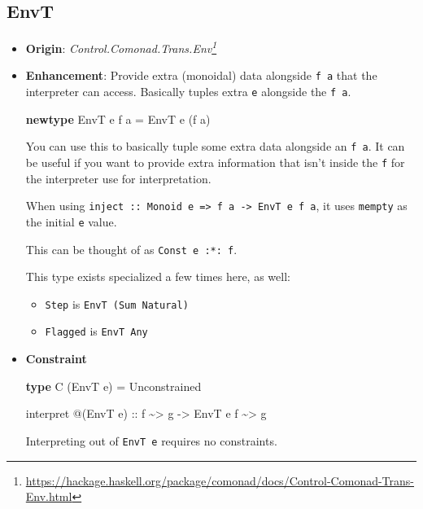 \documentclass[]{article}
\newenvironment{Shaded}{}{}
\newcommand{\DataTypeTok}[1]{\textcolor[rgb]{0.56,0.13,0.00}{#1}}
\newcommand{\KeywordTok}[1]{\textcolor[rgb]{0.00,0.44,0.13}{\textbf{#1}}}
\newcommand{\NormalTok}[1]{#1}
\newcommand{\OperatorTok}[1]{\textcolor[rgb]{0.40,0.40,0.40}{#1}}
\newcommand{\OtherTok}[1]{\textcolor[rgb]{0.00,0.44,0.13}{#1}}
\renewcommand{\href}[2]{#2\footnote{\url{#1}}}
\begin{document}
\hypertarget{envt}{%
\subsection{EnvT}\label{envt}}

\begin{itemize}
\item
  \textbf{Origin}:
  \emph{\href{https://hackage.haskell.org/package/comonad/docs/Control-Comonad-Trans-Env.html}{Control.Comonad.Trans.Env}}
\item
  \textbf{Enhancement}: Provide extra (monoidal) data alongside \texttt{f\ a}
  that the interpreter can access. Basically tuples extra \texttt{e} alongside
  the \texttt{f\ a}.

\begin{Shaded}
\begin{Highlighting}[]
\KeywordTok{newtype} \DataTypeTok{EnvT}\NormalTok{ e f a }\OtherTok{=} \DataTypeTok{EnvT}\NormalTok{ e (f a)}
\end{Highlighting}
\end{Shaded}

  You can use this to basically tuple some extra data alongside an
  \texttt{f\ a}. It can be useful if you want to provide extra information that
  isn't inside the \texttt{f} for the interpreter use for interpretation.

  When using
  \texttt{inject\ ::\ Monoid\ e\ =\textgreater{}\ f\ a\ -\textgreater{}\ EnvT\ e\ f\ a},
  it uses \texttt{mempty} as the initial \texttt{e} value.

  This can be thought of as \texttt{Const\ e\ :*:\ f}.

  This type exists specialized a few times here, as well:

  \begin{itemize}
  \tightlist
  \item
    \texttt{Step} is \texttt{EnvT\ (Sum\ Natural)}
  \item
    \texttt{Flagged} is \texttt{EnvT\ Any}
  \end{itemize}
\item
  \textbf{Constraint}

\begin{Shaded}
\begin{Highlighting}[]
\KeywordTok{type} \DataTypeTok{C}\NormalTok{ (}\DataTypeTok{EnvT}\NormalTok{ e) }\OtherTok{=} \DataTypeTok{Unconstrained}

\NormalTok{interpret }\OperatorTok{@}\NormalTok{(}\DataTypeTok{EnvT}\NormalTok{ e)}
\OtherTok{    ::}\NormalTok{ f }\OperatorTok{\textasciitilde{}>}\NormalTok{ g}
    \OtherTok{{-}>} \DataTypeTok{EnvT}\NormalTok{ e f }\OperatorTok{\textasciitilde{}>}\NormalTok{ g}
\end{Highlighting}
\end{Shaded}

  Interpreting out of \texttt{EnvT\ e} requires no constraints.
\end{itemize}
\end{document}

